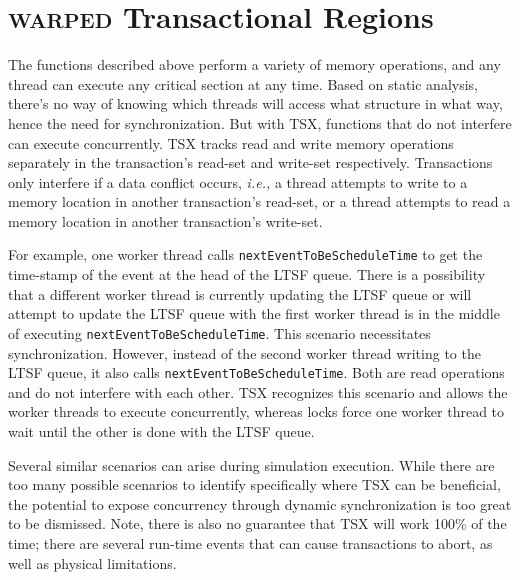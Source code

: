 \documentclass[11pt]{book}
\begin{document}
\section{\textsc{warped} Transactional Regions}

The functions described above perform a variety of memory operations, and any thread can
execute any critical section at any time.  Based on static analysis, there's no way of
knowing which threads will access what structure in what way, hence the need for
synchronization.  But with TSX, functions that do not interfere can execute concurrently.
TSX tracks read and write memory operations separately in the transaction's read-set and
write-set respectively.  Transactions only interfere if a data conflict occurs, \emph{i.e.,} a
thread attempts to write to a memory location in another transaction's read-set, or a
thread attempts to read a memory location in another transaction's write-set.

For example, one worker thread calls \texttt{nextEventToBeScheduleTime} to get the
time-stamp of the event at the head of the LTSF queue.  There is a possibility that a
different worker thread is currently updating the LTSF queue or will attempt to update the
LTSF queue with the first worker thread is in the middle of executing
\texttt{nextEventToBeScheduleTime}.  This scenario necessitates synchronization.  However,
instead of the second worker thread writing to the LTSF queue, it also calls
\texttt{nextEventToBeScheduleTime}.  Both are read operations and do not interfere with
each other.  TSX recognizes this scenario and allows the worker threads to execute
concurrently, whereas locks force one worker thread to wait until the other is done with
the LTSF queue.

Several similar scenarios can arise during simulation execution. While there are too many
possible scenarios to identify specifically where TSX can be beneficial, the potential to
expose concurrency through dynamic synchronization is too great to be dismissed. Note,
there is also no guarantee that TSX will work 100\% of the time; there are several
run-time events that can cause transactions to abort, as well as physical limitations.
\end{document}
